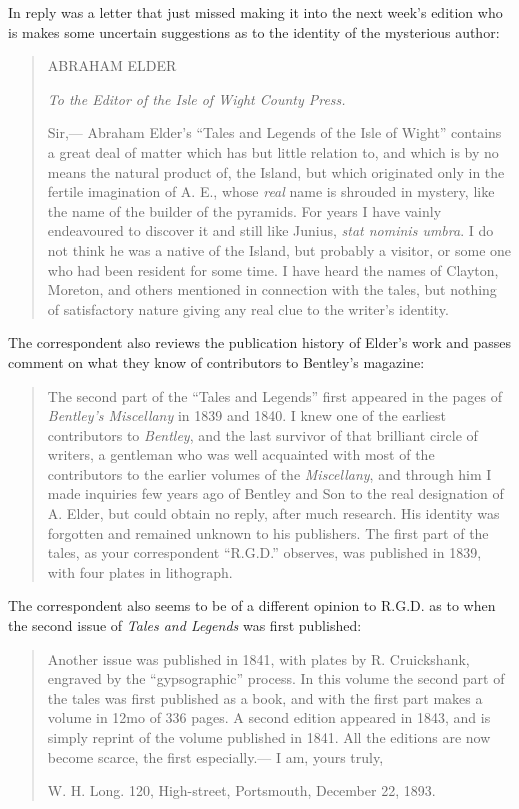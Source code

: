 \documentclass[
  12pt,
  a5paper,
  twoside]{book}
\begin{document}
In reply was a letter that just missed making it into the next week's
edition who is makes some uncertain suggestions as to the identity of
the mysterious author:

\begin{quote}
ABRAHAM ELDER

\emph{To the Editor of the Isle of Wight County Press.}

Sir,--- Abraham Elder's ``Tales and Legends of the Isle of Wight''
contains a great deal of matter which has but little relation to, and
which is by no means the natural product of, the Island, but which
originated only in the fertile imagination of A. E., whose \emph{real}
name is shrouded in mystery, like the name of the builder of the
pyramids. For years I have vainly endeavoured to discover it and still
like Junius, \emph{stat nominis umbra}. I do not think he was a native
of the Island, but probably a visitor, or some one who had been resident
for some time. I have heard the names of Clayton, Moreton, and others
mentioned in connection with the tales, but nothing of satisfactory
nature giving any real clue to the writer's identity.
\end{quote}

The correspondent also reviews the publication history of Elder's work
and passes comment on what they know of contributors to Bentley's
magazine:

\begin{quote}
The second part of the ``Tales and Legends'' first appeared in the pages
of \emph{Bentley's Miscellany} in 1839 and 1840. I knew one of the
earliest contributors to \emph{Bentley}, and the last survivor of that
brilliant circle of writers, a gentleman who was well acquainted with
most of the contributors to the earlier volumes of the
\emph{Miscellany}, and through him I made inquiries few years ago of
Bentley and Son to the real designation of A. Elder, but could obtain no
reply, after much research. His identity was forgotten and remained
unknown to his publishers. The first part of the tales, as your
correspondent ``R.G.D.'' observes, was published in 1839, with four
plates in lithograph.
\end{quote}

The correspondent also seems to be of a different opinion to R.G.D. as
to when the second issue of \emph{Tales and Legends} was first
published:

\begin{quote}
Another issue was published in 1841, with plates by R. Cruickshank,
engraved by the ``gypsographic'' process. In this volume the second part
of the tales was first published as a book, and with the first part
makes a volume in 12mo of 336 pages. A second edition appeared in 1843,
and is simply reprint of the volume published in 1841. All the editions
are now become scarce, the first especially.--- I am, yours truly,

W. H. Long. 120, High-street, Portsmouth, December 22, 1893.
\end{quote}
\end{document}
